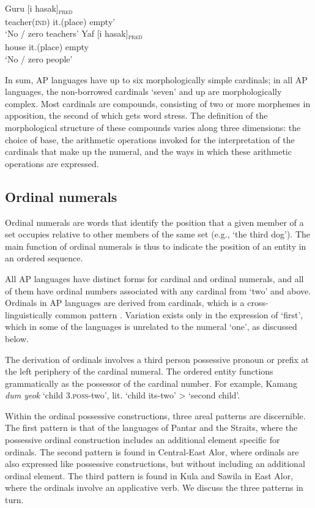 \documentclass[output=paper]{LSP/langsci}
\begin{document}
\ea%
\label{bkm:Ref355363568}
\\
\ea
\label{ex:8:1234}
\gll Guru       [i       hasak]\textsc{\textsubscript{pred}} \\  
     teacher\textsc{(ind)}   it.(place)    empty'  \\
\glt  `No / zero teachers' 
\ex
\gll Yaf [i     hasak]\textsc{\textsubscript{pred}} \\
    house      it.(place)   empty\\
\glt    `No / zero people' 
\z
\z

In sum, AP languages have up to six morphologically simple cardinals; in all AP languages, the non-borrowed cardinals `seven' and up are morphologically complex. Most cardinals are compounds, consisting of two or more morphemes in apposition, the second of which gets word stress. The definition of the morphological structure of these compounds varies along three dimensions: the choice of base, the arithmetic operations invoked for the interpretation of the cardinals that make up the numeral, and the ways in which these arithmetic operations are expressed. 

\subsection{Ordinal numerals}
\label{sec:8:Ordinal}
Ordinal numerals are words that identify the position that a given member of a set occupies relative to other members of the same set (e.g., `the third dog'). The main function of ordinal numerals is thus to indicate the position of an entity in an ordered sequence. 

All AP languages have distinct forms for cardinal and ordinal numerals, and all of them have ordinal numbers associated with any cardinal from `two' and above. Ordinals in AP languages are derived from cardinals, which is a cross-linguistically common pattern \citep{StolzEtAl2013}. Variation exists only in the expression of `first', which in some of the languages is unrelated to the numeral `one', as discussed below. 

The derivation of ordinals involves a third person possessive pronoun or prefix at the left periphery of the cardinal numeral. The ordered entity functions grammatically as the possessor of the cardinal number. For example, Kamang \textit{dum yeok} `child 3.\textsc{poss}{}-two', lit. `child its-two' {\textgreater} `second child'. 

Within the ordinal possessive constructions, three areal patterns are discernible. The first pattern is that of the languages of Pantar and the Straits, where the possessive ordinal construction includes an additional element specific for ordinals. The second pattern is found in Central-East Alor, where ordinals are also expressed like possessive constructions, but without including an additional ordinal element. The third pattern is found in Kula and Sawila in East Alor, where the ordinals involve an applicative verb. We discuss the three patterns in turn.
\end{document}
